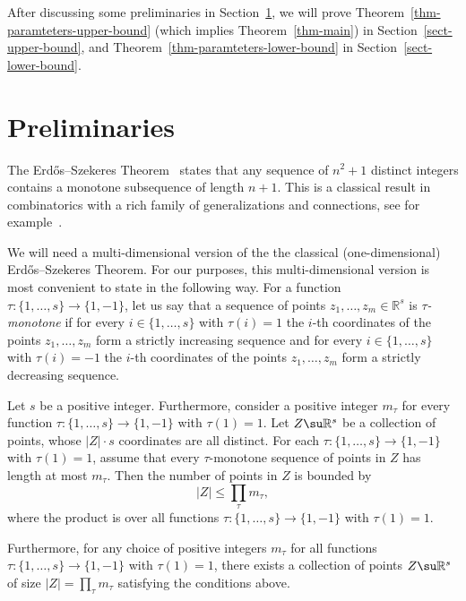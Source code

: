 After discussing some preliminaries in Section~\ref{sect-preliminaries}, we will prove Theorem~\ref{thm-paramteters-upper-bound} (which implies Theorem~\ref{thm-main}) in Section~\ref{sect-upper-bound}, and Theorem~\ref{thm-paramteters-lower-bound} in Section~\ref{sect-lower-bound}.

\section{Preliminaries}
\label{sect-preliminaries}

The Erd\H{o}s--Szekeres Theorem~\cite{ES} states that any sequence of $n^2+1$ distinct integers contains a monotone subsequence of length $n+1$. This is a classical result in combinatorics with a rich family of generalizations and connections, see for example~\cite{ExpES,GL,LS,MS,ST}.

We will need a multi-dimensional version of the the classical (one-dimensional) Erd\H{o}s--Szekeres Theorem. For our purposes, this multi-dimensional version is most convenient to state in the following way. For a function $\tau:\{1,\dots,s\}\to \{1,-1\}$, let us say that a sequence of points $z_1,\dots,z_m\in \mathbb{R}^s$ is \emph{$\tau$-monotone} if for every $i\in \{1,\dots,s\}$ with $\tau(i)=1$ the $i$-th coordinates of the points $z_1,\dots,z_m$ form a strictly increasing sequence and for every $i\in \{1,\dots,s\}$ with $\tau(i)=-1$ the $i$-th coordinates of the points $z_1,\dots,z_m$ form a strictly decreasing sequence. 

\begin{theorem}\label{thm_es}
Let $s$ be a positive integer. Furthermore, consider a positive integer $m_\tau$ for every function $\tau:\{1,\dots,s\}\to \{1,-1\}$ with $\tau(1)=1$. Let $Z\su \mathbb{R}^s$ be a collection of points, whose $|Z|\cdot s$ coordinates are all distinct. For each $\tau:\{1,\dots,s\}\to \{1,-1\}$ with $\tau(1)=1$, assume that every $\tau$-monotone sequence of points in $Z$ has length at most $m_\tau$. Then the number of points in $Z$ is bounded by
\[|Z|\le \prod_{\tau} m_{\tau},\]
where the product is over all functions $\tau:\{1,\dots,s\}\to \{1,-1\}$ with $\tau(1)=1$.

Furthermore, for any choice of positive integers $m_\tau$ for all functions $\tau:\{1,\dots,s\}\to \{1,-1\}$ with $\tau(1)=1$, there exists a collection of points $Z\su \mathbb{R}^s$ of size $|Z|=\prod_\tau m_\tau$ satisfying the conditions above.
\end{theorem}

